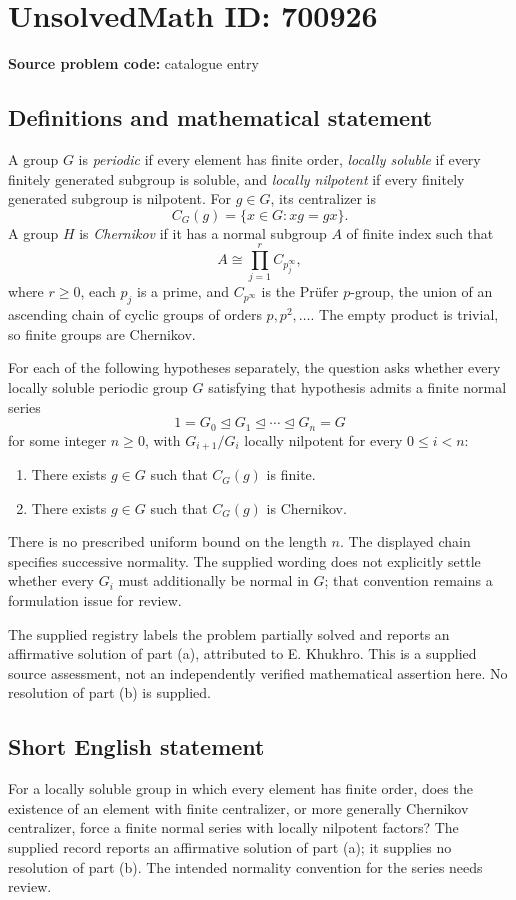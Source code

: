 \documentclass[11pt]{article}
\begin{document}
\section*{UnsolvedMath ID: 700926}
\textbf{Source problem code:} catalogue entry
\subsection{Definitions and mathematical statement}
A group \(G\) is \emph{periodic} if every element has finite order, \emph{locally soluble} if every finitely generated subgroup is soluble, and \emph{locally nilpotent} if every finitely generated subgroup is nilpotent. For \(g\in G\), its centralizer is
\[
C_G(g)=\{x\in G:xg=gx\}.
\]
A group \(H\) is \emph{Chernikov} if it has a normal subgroup \(A\) of finite index such that
\[
A\cong\prod_{j=1}^{r}C_{p_j^\infty},
\]
where \(r\geq 0\), each \(p_j\) is a prime, and \(C_{p^\infty}\) is the Prüfer \(p\)-group, the union of an ascending chain of cyclic groups of orders \(p,p^2,\ldots\). The empty product is trivial, so finite groups are Chernikov.

For each of the following hypotheses separately, the question asks whether every locally soluble periodic group \(G\) satisfying that hypothesis admits a finite normal series
\[
1=G_0\trianglelefteq G_1\trianglelefteq\cdots\trianglelefteq G_n=G
\]
for some integer \(n\geq 0\), with \(G_{i+1}/G_i\) locally nilpotent for every \(0\leq i<n\):
\begin{enumerate}
\item[(a)] There exists \(g\in G\) such that \(C_G(g)\) is finite.
\item[(b)] There exists \(g\in G\) such that \(C_G(g)\) is Chernikov.
\end{enumerate}
There is no prescribed uniform bound on the length \(n\). The displayed chain specifies successive normality. The supplied wording does not explicitly settle whether every \(G_i\) must additionally be normal in \(G\); that convention remains a formulation issue for review.

The supplied registry labels the problem partially solved and reports an affirmative solution of part (a), attributed to E. Khukhro. This is a supplied source assessment, not an independently verified mathematical assertion here. No resolution of part (b) is supplied.
\subsection{Short English statement}
For a locally soluble group in which every element has finite order, does the existence of an element with finite centralizer, or more generally Chernikov centralizer, force a finite normal series with locally nilpotent factors? The supplied record reports an affirmative solution of part (a); it supplies no resolution of part (b). The intended normality convention for the series needs review.
\end{document}
